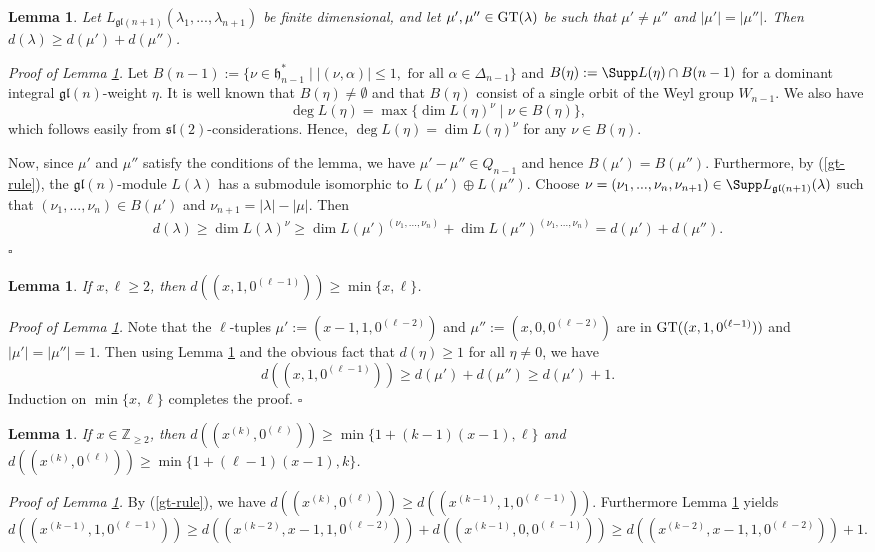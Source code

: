 \documentclass[12pt]{amsart}
\newtheorem{lem}[thm]{Lemma}
\begin{document}
\begin{lem} \label{lem-0}
Let $L_{\mathfrak{gl}({n+1})}(\lambda_1,...,\lambda_{n+1})$ be finite dimensional, and let $\mu',\mu'' \in {\rm GT} (\lambda)$ be such that $\mu' \neq \mu''$ and $|\mu'|=|\mu''|$. Then $d(\lambda) \geq d(\mu') + d(\mu'')$. 
\end{lem}
\noindent \emph{Proof of Lemma \ref{lem-0}.}  
Let $B(n-1) := \{\nu \in {\mathfrak h}_{n-1}^* \; | \;  |(\nu, \alpha)|\leq 1, \mbox{ for all } \alpha \in \Delta_{n-1} \} $ and  $B(\eta) := \Supp L(\eta)\cap B({n-1})$ for a dominant integral ${\mathfrak{gl}(n)}$-weight $\eta$. It is well known that $B(\eta) \neq \emptyset$ and that  $B(\eta)$ consist of a single orbit of the Weyl group $W_{n-1}$. We also have  
\begin{equation*} 
\deg L(\eta) = \max \{ \dim L(\eta)^{\nu} \; | \; \nu \in B(\eta)\}, 
\end{equation*}
which follows easily from  $\mathfrak{sl}(2)${-considerations}. Hence, $\deg L(\eta) = \dim L(\eta)^{\nu}$ for any $\nu \in B(\eta)$.




Now, since $\mu'$ and $\mu''$ satisfy the conditions of the lemma, we have $\mu'-\mu'' \in Q_{n-1}$ and hence $B(\mu') = B(\mu'')$. Furthermore,  by (\ref{gt-rule}),  the $\mathfrak{gl}({n})$-module $L(\lambda)$ has a submodule isomorphic to $L(\mu')\oplus L(\mu'')$. Choose $\nu = (\nu_1,...,\nu_{n}, \nu_{n+1}) \in \Supp L_{\mathfrak{gl}({n+1})}(\lambda)$ such that $(\nu_1,...,\nu_{n}) \in  B(\mu')$ and $\nu_{n+1} = |\lambda|-|\mu|$. Then 
\begin{eqnarray*}
 d(\lambda) \geq   \dim L(\lambda)^{\nu}  \geq  \dim L(\mu')^{(\nu_1,...,\nu_{n})} + \dim L(\mu'')^{(\nu_1,...,\nu_{n})}  = d(\mu') + d(\mu'').
 \end{eqnarray*}
\hfill $\square$

\begin{lem} \label{lem-1}
If $x, \ell \geq 2$, then $d((x,1,0^{(\ell-1)})) \geq \min \{ x, \ell\}$.
\end{lem}
\noindent\emph{Proof of Lemma \ref{lem-1}.}  Note that  the $\ell$-tuples $\mu':=(x-1,1,0^{(\ell -2)})$ and $\mu'':=(x,0,0^{(\ell -2)})$
 are in ${\rm GT} ((x,1,0^{(\ell-1)}))$ and $|\mu'|=|\mu''|=1$. Then using Lemma \ref{lem-0} and the obvious fact that $d(\eta) \geq 1$ for all $\eta \neq 0$, we have
$$
d((x,1,0^{(\ell-1)})) \geq d(\mu') + d(\mu'') \geq d(\mu') + 1.
$$
Induction on $\min \{ x, \ell\}$ completes the proof. \hfill $\square$

\begin{lem} \label{lem-2}
If $x\in \mathbb{Z}_{ \geq 2}$, then $d((x^{(k)},0^{(\ell)})) \geq \min \{ 1+(k-1)(x-1), \ell\}$ and $d((x^{(k)},0^{(\ell)})) \geq \min \{ 1+(\ell-1)(x-1), k\}$.
\end{lem}
\noindent\emph{Proof of Lemma \ref{lem-2}.}  By (\ref{gt-rule}), we have $d((x^{(k)},0^{(\ell)}))  \geq d((x^{(k-1)},1, 0^{(\ell-1)}))$.  Furthermore Lemma \ref{lem-0} yields
$$
d((x^{(k-1)},1, 0^{(\ell-1)})) \geq d((x^{(k-2)},x-1,1, 0^{(\ell-2)})) + d((x^{(k-1)}, 0, 0^{(\ell-1)})) \geq d((x^{(k-2)},x-1,1, 0^{(\ell-2)})) + 1.
$$
\end{document}
